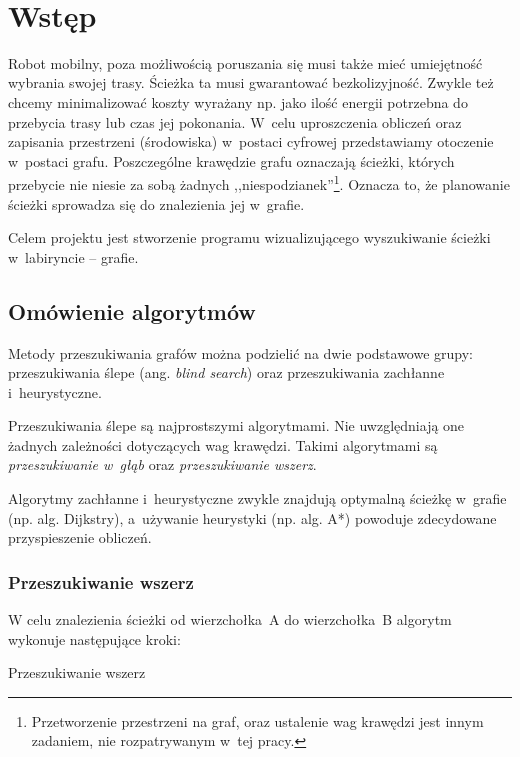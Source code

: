 \documentclass[11pt,a4paper,oneside]{mwart}
\begin{document}



\newpage
\thispagestyle{empty}
~~~~~~~~~~~~~~
\newpage

\setcounter{tocdepth}{3}
\tableofcontents
\newpage

\section{Wstęp}

Robot mobilny, poza możliwością poruszania się musi także mieć umiejętność wybrania swojej trasy.
Ścieżka ta musi gwarantować bezkolizyjność. 
Zwykle też chcemy minimalizować koszty wyrażany np. jako ilość energii potrzebna do przebycia trasy 
lub czas jej pokonania.
W~celu uproszczenia obliczeń oraz zapisania przestrzeni (środowiska) w~postaci cyfrowej przedstawiamy 
otoczenie w~postaci grafu. 
Poszczególne krawędzie grafu oznaczają ścieżki, których przebycie nie niesie za sobą żadnych 
,,niespodzianek''\footnote{Przetworzenie przestrzeni na graf, oraz ustalenie wag krawędzi jest innym 
zadaniem, nie rozpatrywanym w~tej pracy.}.
Oznacza to, że planowanie ścieżki sprowadza się do znalezienia jej w~grafie.

Celem projektu jest stworzenie programu wizualizującego wyszukiwanie ścieżki w~labiryncie -- grafie.

\subsection{Omówienie algorytmów}

Metody przeszukiwania grafów można podzielić na dwie podstawowe grupy: 
przeszukiwania ślepe (ang. \emph{blind search}) oraz przeszukiwania zachłanne i~heurystyczne.

Przeszukiwania ślepe są najprostszymi algorytmami. 
Nie uwzględniają one żadnych zależności dotyczących wag krawędzi.
Takimi algorytmami są \emph{przeszukiwanie w~głąb} oraz \emph{przeszukiwanie wszerz}.

Algorytmy zachłanne i~heurystyczne zwykle znajdują optymalną ścieżkę w~grafie 
(np. alg. Dijkstry), a~używanie heurystyki (np. alg. A*) powoduje zdecydowane przyspieszenie obliczeń.

\subsubsection{Przeszukiwanie wszerz}
W celu znalezienia ścieżki od wierzchołka~A do wierzchołka~B algorytm wykonuje następujące kroki:
\begin{algorithm}
\caption{Przeszukiwanie wszerz}
\label{algorytm_wszerz}
\begin{algorithmic}[1]
		\ENDIF
	\ENDFOR
\ENDWHILE
\end{algorithmic}
\end{algorithm}
\end{document}

